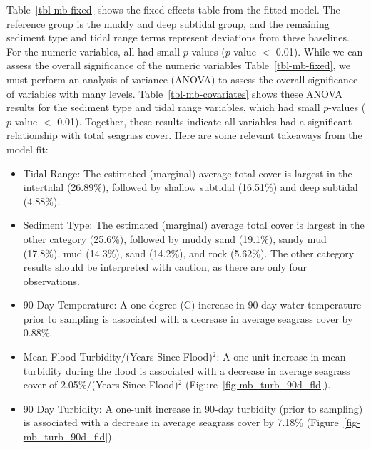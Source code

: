 \documentclass[
  letterpaper,
  DIV=11,
  numbers=noendperiod]{scrartcl}
\providecommand{\tightlist}{%
  \setlength{\itemsep}{0pt}\setlength{\parskip}{0pt}}
\begin{document}
Table~\ref{tbl-mb-fixed} shows the fixed effects table from the fitted
model. The reference group is the muddy and deep subtidal group, and the
remaining sediment type and tidal range terms represent deviations from
these baselines. For the numeric variables, all had small \(p\)-values
(\(p\)-value \(<\) 0.01). While we can assess the overall significance
of the numeric variables Table~\ref{tbl-mb-fixed}, we must perform an
analysis of variance (ANOVA) to assess the overall significance of
variables with many levels. Table~\ref{tbl-mb-covariates} shows these
ANOVA results for the sediment type and tidal range variables, which had
small \(p\)-values (\(p\)-value \(<\) 0.01). Together, these results
indicate all variables had a significant relationship with total
seagrass cover. Here are some relevant takeaways from the model fit:

\begin{itemize}
\tightlist
\item
  Tidal Range: The estimated (marginal) average total cover is largest
  in the intertidal (26.89\%), followed by shallow subtidal (16.51\%)
  and deep subtidal (4.88\%).
\item
  Sediment Type: The estimated (marginal) average total cover is largest
  in the other category (25.6\%), followed by muddy sand (19.1\%), sandy
  mud (17.8\%), mud (14.3\%), sand (14.2\%), and rock (5.62\%). The
  other category results should be interpreted with caution, as there
  are only four observations.
\item
  90 Day Temperature: A one-degree (C) increase in 90-day water
  temperature prior to sampling is associated with a decrease in average
  seagrass cover by 0.88\%.
\item
  Mean Flood Turbidity/(Years Since Flood)\(^2\): A one-unit increase in
  mean turbidity during the flood is associated with a decrease in
  average seagrass cover of 2.05\%/(Years Since Flood)\(^2\)
  (Figure~\ref{fig-mb_turb_90d_fld}).
\item
  90 Day Turbidity: A one-unit increase in 90-day turbidity (prior to
  sampling) is associated with a decrease in average seagrass cover by
  7.18\% (Figure~\ref{fig-mb_turb_90d_fld}).
\end{itemize}

\begin{table}

\caption{\label{tbl-mb-covariates}ANOVA table of covariates for the
categorical variables in the Moreton Bay water quality and geographic
model.}


\end{table}%
\end{document}
